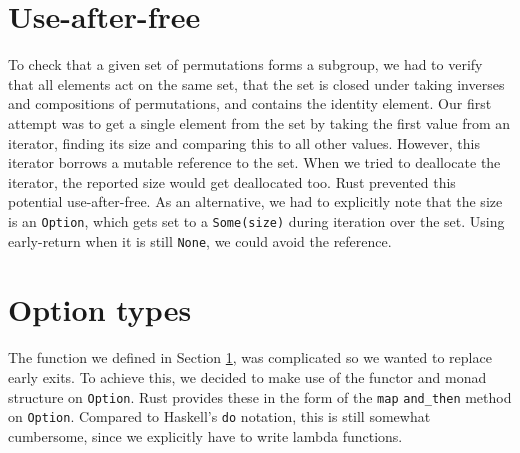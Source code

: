 \documentclass{article}
\begin{document}
\section{Use-after-free} \label{sec:use_after_free}

To check that a given set of permutations forms a subgroup, we had to verify that all elements act on the same set, that the set is closed under taking inverses and compositions of permutations, and contains the identity element. Our first attempt was to get a single element from the set by taking the first value from an iterator, finding its size and comparing this to all other values. However, this iterator borrows a mutable reference to the set. When we tried to deallocate the iterator, the reported size would get deallocated too. Rust prevented this potential use-after-free.
As an alternative, we had to explicitly note that the size is an \texttt{Option}, which gets set to a \texttt{Some(size)} during iteration over the set. Using early-return when it is still \texttt{None}, we could avoid the reference.

\section{Option types}

The function we defined in Section \ref{sec:use_after_free}, was complicated so we wanted to replace early exits. To achieve this, we decided to make use of the functor and monad structure on \texttt{Option}. Rust provides these in the form of the \texttt{map} \texttt{and\_then} method on \texttt{Option}. Compared to Haskell's \texttt{do} notation, this is still somewhat cumbersome, since we explicitly have to write lambda functions.
\end{document}
